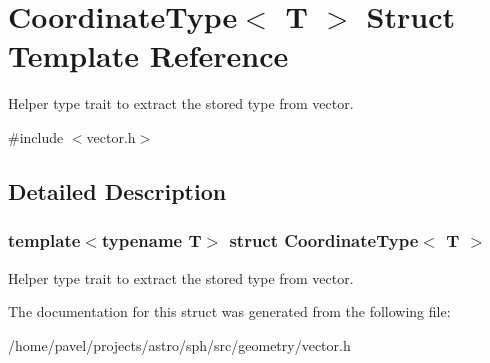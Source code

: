 \hypertarget{structCoordinateType}{}\section{Coordinate\+Type$<$ T $>$ Struct Template Reference}
\label{structCoordinateType}


Helper type trait to extract the stored type from vector.  




{\ttfamily \#include $<$vector.\+h$>$}



\subsection{Detailed Description}
\subsubsection*{template$<$typename T$>$\newline
struct Coordinate\+Type$<$ T $>$}

Helper type trait to extract the stored type from vector. 

The documentation for this struct was generated from the following file\+:\begin{DoxyCompactItemize}
\item 
/home/pavel/projects/astro/sph/src/geometry/vector.\+h\end{DoxyCompactItemize}
